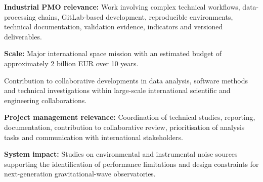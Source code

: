\documentclass[8pt,a4paper,ragged2e,withhyper]{altacv}
\begin{document}
\textbf{Industrial PMO relevance:} Work involving complex technical workflows, data-processing chains, GitLab-based development, reproducible environments, technical documentation, validation evidence, indicators and versioned deliverables.

\textbf{Scale:} Major international space mission with an estimated budget of approximately 2 billion EUR over 10 years.

\divider


Contribution to collaborative developments in data analysis, software methods and technical investigations within large-scale international scientific and engineering collaborations.

\textbf{Project management relevance:} Coordination of technical studies, reporting, documentation, contribution to collaborative review, prioritisation of analysis tasks and communication with international stakeholders.

\textbf{System impact:} Studies on environmental and instrumental noise sources supporting the identification of performance limitations and design constraints for next-generation gravitational-wave observatories.


\vspace{-.3cm}


{\small
{}
\newline

}

\divider\smallskip
\vspace{-.3cm}
\newpage


{\small
{}
}
\end{document}
